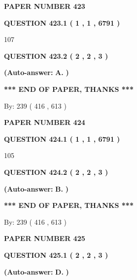 \documentclass{ctexart}
\begin{document}
   
\newpage 
\setcounter{page}{ 
   423001 } 
   
   
 {\textbf{ \Large{ PAPER NUMBER  423  }}}
   
   
   
   
  
  
{\textbf{\large{QUESTION
423.1 
 ( 1 , 1 , 6791 )
}}}

107
  
  
{\textbf{\large{QUESTION
423.2 
 ( 2 , 2 , 3 )
}}}
 
 
{\textbf{(Auto-answer:}}
{\textbf{\large{
A.}}}
{\textbf{)}}
 
 
   
   
   
   
\vspace{1.0in} 
{\textbf{\large{ *** END OF PAPER, THANKS *** }}} 
   
   
\hspace{1.0in} By: 
 239 ( 416 ,  613 )
   
   
   
   
\newpage 
\setcounter{page}{ 
   424001 } 
   
   
 {\textbf{ \Large{ PAPER NUMBER  424  }}}
   
   
   
   
  
  
{\textbf{\large{QUESTION
424.1 
 ( 1 , 1 , 6791 )
}}}

105
  
  
{\textbf{\large{QUESTION
424.2 
 ( 2 , 2 , 3 )
}}}
 
 
{\textbf{(Auto-answer:}}
{\textbf{\large{
B.}}}
{\textbf{)}}
 
 
   
   
   
   
\vspace{1.0in} 
{\textbf{\large{ *** END OF PAPER, THANKS *** }}} 
   
   
\hspace{1.0in} By: 
 239 ( 416 ,  613 )
   
   
   
   
\newpage 
\setcounter{page}{ 
   425001 } 
   
   
 {\textbf{ \Large{ PAPER NUMBER  425  }}}
   
   
   
   
  
  
{\textbf{\large{QUESTION
425.1 
 ( 2 , 2 , 3 )
}}}
 
 
{\textbf{(Auto-answer:}}
{\textbf{\large{
D.}}}
{\textbf{)}}
 
 
  
\end{document}
